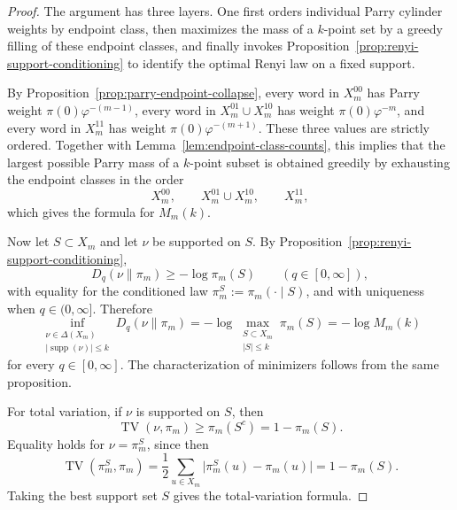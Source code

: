 \documentclass[11pt,letterpaper]{article}
\numberwithin{equation}{section}
\theoremstyle{plain}
\theoremstyle{definition}
\theoremstyle{remark}
\DeclareMathOperator{\TV}{TV}
\DeclareMathOperator{\supp}{supp}
\begin{document}
\begin{proof}
The argument has three layers. One first orders individual Parry cylinder
weights by endpoint class, then maximizes the mass of a \(k\)-point set by a
greedy filling of these endpoint classes, and finally invokes
Proposition~\ref{prop:renyi-support-conditioning} to identify the optimal
Renyi law on a fixed support.

By Proposition~\ref{prop:parry-endpoint-collapse}, every word in \(X_m^{00}\) has
Parry weight \(\pi(0)\varphi^{-(m-1)}\), every word in \(X_m^{01}\cup X_m^{10}\)
has weight \(\pi(0)\varphi^{-m}\), and every word in \(X_m^{11}\) has weight
\(\pi(0)\varphi^{-(m+1)}\). These three values are strictly ordered. Together
with Lemma~\ref{lem:endpoint-class-counts}, this implies that the largest
possible Parry mass of a \(k\)-point subset is obtained greedily by exhausting
the endpoint classes in the order
\[
X_m^{00},\qquad X_m^{01}\cup X_m^{10},\qquad X_m^{11},
\]
which gives the formula for \(M_m(k)\).

Now let \(S\subset X_m\) and let \(\nu\) be supported on \(S\). By
Proposition~\ref{prop:renyi-support-conditioning},
\[
D_q(\nu\|\pi_m)
\ge
-\log \pi_m(S)
\qquad (q\in[0,\infty]),
\]
with equality for the conditioned law \(\pi_m^S:=\pi_m(\cdot\mid S)\), and
with uniqueness when \(q\in(0,\infty]\). Therefore
\[
\inf_{\substack{\nu\in\Delta(X_m)\\ |\supp(\nu)|\le k}}D_q(\nu\|\pi_m)
=
-\log\max_{\substack{S\subset X_m\\ |S|\le k}}\pi_m(S)
=
-\log M_m(k)
\]
for every \(q\in[0,\infty]\). The characterization of minimizers follows from
the same proposition.

For total variation, if \(\nu\) is supported on \(S\), then
\[
\TV(\nu,\pi_m)
\ge
\pi_m(S^c)
=
1-\pi_m(S).
\]
Equality holds for \(\nu=\pi_m^S\), since then
\[
\TV(\pi_m^S,\pi_m)
=
\frac12\sum_{u\in X_m}\bigl|\pi_m^S(u)-\pi_m(u)\bigr|
=
1-\pi_m(S).
\]
Taking the best support set \(S\) gives the total-variation formula.
\end{proof}
\end{document}
